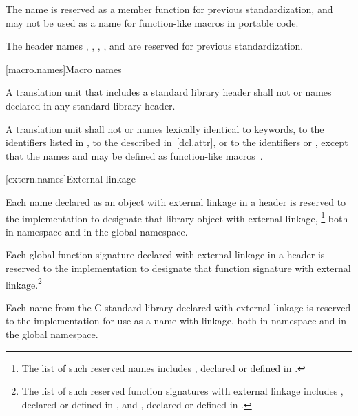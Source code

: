 \pnum
The name   is reserved as a
member function for previous standardization, and may not be used as a name for
function-like macros in portable code.

\pnum
The header names , , ,
, and  are reserved for previous standardization.

[macro.names]{Macro names}

\pnum
{}%
%
A translation unit that includes a standard library header shall not
 or  names declared in any standard
library header.

\pnum
{}%
A translation unit shall not  or 
names lexically identical
to keywords,
to the identifiers listed in ,
to the  described in~\ref{dcl.attr}, or
to the identifiers  or ,
except that the names  and  may be
defined as function-like macros~.

[extern.names]{External linkage}

\pnum
Each name declared as an object with external linkage
%
in a header is reserved to the implementation to designate that library
object with external linkage,%
\footnote{The list of such reserved names includes
,
declared or defined in
%
.}
both in namespace
and in the global namespace.

\pnum
Each
%
global function signature declared with
%
external linkage in a header is reserved to the
implementation to designate that function signature with
%
external linkage.\footnote{The list of such reserved function
signatures with external linkage includes
%
,
declared or defined in
%
,
and
%
%
,
declared or defined in
%
.}

\pnum
Each name from the C standard library declared with external linkage
%
is reserved to the implementation for use as a name with
%
%
linkage,
both in namespace  and in the global namespace.

